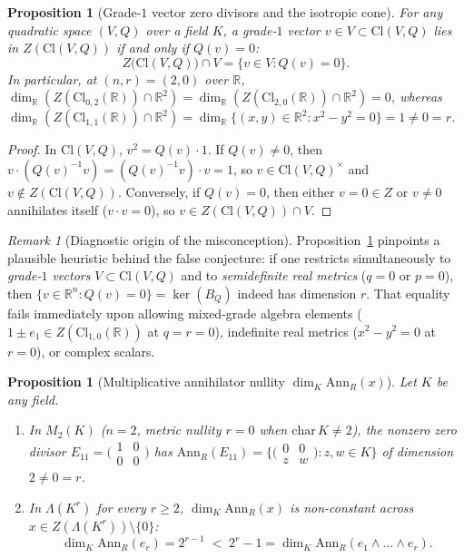 \documentclass[11pt,a4paper]{article}
\newtheorem{proposition}[theorem]{Proposition}
\theoremstyle{definition}
\theoremstyle{remark}
\newtheorem{remark}[theorem]{Remark}
\newcommand{\Cl}{\mathrm{Cl}}
\newcommand{\Ann}{\mathrm{Ann}}
\begin{document}
\begin{proposition}[Grade-$1$ vector zero divisors and the isotropic cone]\label{prop:grade1}
For any quadratic space $(V, Q)$ over a field $K$, a grade-$1$ vector $v \in V \subset \Cl(V, Q)$ lies in $Z(\Cl(V, Q))$ if and only if $Q(v) = 0$:
\[
Z\bigl(\Cl(V, Q)\bigr) \cap V = \{v \in V : Q(v) = 0\}.
\]
In particular, at $(n, r) = (2, 0)$ over $\mathbb{R}$, $\dim_{\mathbb{R}}(Z(\Cl_{0,2}(\mathbb{R})) \cap \mathbb{R}^2) = \dim_{\mathbb{R}}(Z(\Cl_{2,0}(\mathbb{R})) \cap \mathbb{R}^2) = 0$, whereas $\dim_{\mathbb{R}}(Z(\Cl_{1,1}(\mathbb{R})) \cap \mathbb{R}^2) = \dim_{\mathbb{R}}\{(x, y) \in \mathbb{R}^2 : x^2 - y^2 = 0\} = 1 \neq 0 = r$.
\end{proposition}

\begin{proof}
In $\Cl(V, Q)$, $v^2 = Q(v)\cdot 1$. If $Q(v) \neq 0$, then $v \cdot (Q(v)^{-1} v) = (Q(v)^{-1} v) \cdot v = 1$, so $v \in \Cl(V, Q)^\times$ and $v \notin Z(\Cl(V, Q))$. Conversely, if $Q(v) = 0$, then either $v = 0 \in Z$ or $v \neq 0$ annihilates itself ($v \cdot v = 0$), so $v \in Z(\Cl(V, Q)) \cap V$.
\end{proof}

\begin{remark}[Diagnostic origin of the misconception]
Proposition~\ref{prop:grade1} pinpoints a plausible heuristic behind the false conjecture: if one restricts simultaneously to \emph{grade-$1$ vectors} $V \subset \Cl(V, Q)$ and to \emph{semidefinite real metrics} ($q = 0$ or $p = 0$), then $\{v \in \mathbb{R}^n : Q(v) = 0\} = \ker(B_Q)$ indeed has dimension $r$. That equality fails immediately upon allowing mixed-grade algebra elements ($1 \pm e_1 \in Z(\Cl_{1,0}(\mathbb{R}))$ at $q = r = 0$), indefinite real metrics ($x^2 - y^2 = 0$ at $r = 0$), or complex scalars.
\end{remark}

\begin{proposition}[Multiplicative annihilator nullity $\dim_K \Ann_R(x)$]\label{prop:annihilator}
Let $K$ be any field.
\begin{enumerate}
\setlength{\itemsep}{2pt}\setlength{\parskip}{0pt}
\item[(i)] In $M_2(K)$ ($n = 2$, metric nullity $r = 0$ when $\mathrm{char}\,K \neq 2$), the nonzero zero divisor $E_{11} = \bigl(\begin{smallmatrix} 1 & 0 \\ 0 & 0 \end{smallmatrix}\bigr)$ has $\Ann_R(E_{11}) = \bigl\{\bigl(\begin{smallmatrix} 0 & 0 \\ z & w \end{smallmatrix}\bigr) : z, w \in K\bigr\}$ of dimension $2 \neq 0 = r$.
\item[(ii)] In $\Lambda(K^r)$ for every $r \ge 2$, $\dim_K \Ann_R(x)$ is non-constant across $x \in Z(\Lambda(K^r)) \setminus \{0\}$:
\[
\dim_K \Ann_R(e_r) = 2^{r-1} \;<\; 2^r - 1 = \dim_K \Ann_R(e_1 \wedge \dots \wedge e_r).
\]
\end{enumerate}
\end{proposition}
\end{document}
